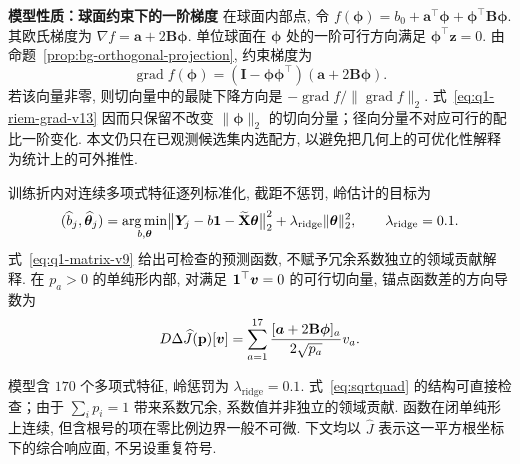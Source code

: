 \textbf{模型性质：球面约束下的一阶梯度}
在球面内部点, 令 $f(\boldsymbol\phi)=b_0+\boldsymbol a^\top\boldsymbol\phi+\boldsymbol\phi^\top\mathbf B\boldsymbol\phi$. 其欧氏梯度为 $\nabla f=\boldsymbol a+2\mathbf B\boldsymbol\phi$. 单位球面在 $\boldsymbol\phi$ 处的一阶可行方向满足 $\boldsymbol\phi^\top\boldsymbol z=0$. 由命题~\ref{prop:bg-orthogonal-projection}, 约束梯度为
\begin{equation}\label{eq:q1-riem-grad-v13}
\operatorname{grad} f(\boldsymbol\phi)
=(\mathbf I-\boldsymbol\phi\boldsymbol\phi^\top)
(\boldsymbol a+2\mathbf B\boldsymbol\phi).
\end{equation}
若该向量非零, 则切向量中的最陡下降方向是
$-\operatorname{grad} f/\|\operatorname{grad}f\|_2$. 式~\eqref{eq:q1-riem-grad-v13} 因而只保留不改变 $\|\boldsymbol\phi\|_2$ 的切向分量；径向分量不对应可行的配比一阶变化. 本文仍只在已观测候选集内选配方, 以避免把几何上的可优化性解释为统计上的可外推性. 

训练折内对连续多项式特征逐列标准化, 截距不惩罚, 岭估计的目标为
\begin{equation}\label{eq:q1-ridge-v9}
(\widehat b_j, \widehat{\boldsymbol\theta}_j)=\operatorname*{arg\,min}_{b, \boldsymbol\theta}
\bigl\|\boldsymbol Y_j-b\mathbf 1-\widetilde{\mathbf X}\boldsymbol\theta\bigr\|_2^2
+\lambda_{\mathrm{ridge}}\|\boldsymbol\theta\|_2^2, 
\qquad \lambda_{\mathrm{ridge}}=0.1.
\end{equation}
式~\eqref{eq:q1-matrix-v9} 给出可检查的预测函数, 不赋予冗余系数独立的领域贡献解释. 在 $p_a>0$ 的单纯形内部, 对满足 $\mathbf 1^\top\boldsymbol v=0$ 的可行切向量, 锚点函数差的方向导数为
\begin{equation}\label{eq:q1-tangent-v9}
D\Delta\widehat J(\mathbf p)[\boldsymbol v]
=\sum_{a=1}^{17}\frac{[\boldsymbol a+2\mathbf B\boldsymbol\phi]_a}{2\sqrt{p_a}}v_a.
\end{equation}

模型含 $170$ 个多项式特征, 岭惩罚为 $\lambda_{\mathrm{ridge}}=0.1$. 式~\eqref{eq:sqrtquad} 的结构可直接检查；由于 $\sum_i p_i=1$ 带来系数冗余, 系数值并非独立的领域贡献. 函数在闭单纯形上连续, 但含根号的项在零比例边界一般不可微. 下文均以 $\widehat J$ 表示这一平方根坐标下的综合响应面, 不另设重复符号. 


